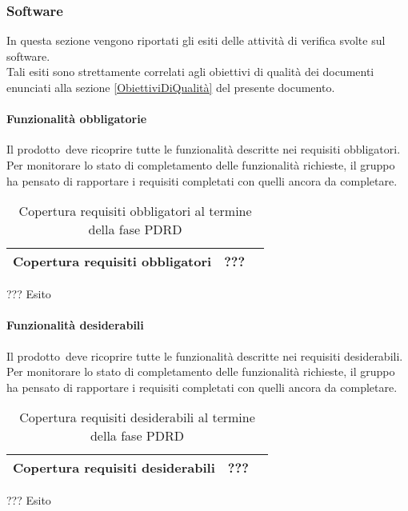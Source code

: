 \documentclass[../PianoDiQualifica.tex]{subfiles}
\begin{document}
\begin{appendices}
			
		\subsubsection{Software}
		In questa sezione vengono riportati gli esiti delle attività di verifica svolte sul software.\\
		Tali esiti sono strettamente correlati agli obiettivi di qualità dei documenti enunciati alla sezione \ref{ObiettiviDiQualità} del presente documento.
		
			\paragraph{Funzionalità obbligatorie}
				Il prodotto\g\ deve ricoprire tutte le funzionalità descritte nei requisiti obbligatori. Per monitorare lo stato di completamento delle funzionalità richieste, il gruppo ha pensato di rapportare i requisiti completati con quelli ancora da completare.
				\begin{table}[H]
				\centering
				\begin{tabular}{l * {2}{c}}
					\midrule
					Copertura requisiti obbligatori & ??? \\
					\midrule
				\end{tabular}
				\caption{Copertura requisiti obbligatori al termine della fase PDRD}
				\label{tab:copertura_requisiti_obbligatori}
			\end{table}
			
			??? Esito 
			
			\paragraph{Funzionalità desiderabili}
				Il prodotto\g\ deve ricoprire tutte le funzionalità descritte nei requisiti desiderabili. Per monitorare lo stato di completamento delle funzionalità richieste, il gruppo ha pensato di rapportare i requisiti completati con quelli ancora da completare.
			\begin{table}[H]
				\centering
				\begin{tabular}{l * {2}{c}}
					\midrule
					Copertura requisiti desiderabili & ??? \\
					\midrule
				\end{tabular}
				\caption{Copertura requisiti desiderabili al termine della fase PDRD}
				\label{tab:copertura_requisiti_desiderabili}
			\end{table}
			
			??? Esito
			

\end{appendices}
\end{document}
